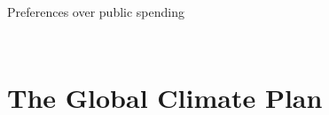 \documentclass[aspectratio=169,xcolor=dvipsnames, 11pt,mathserif]{beamer}
\begin{document}
\begin{frame}{Preferences over public spending%
	\hyperlink{support}{}}
\begin{columns}
\begin{column}{0.5\textwidth}
\begin{figure}
            \end{figure}
        \end{column}
    \end{columns}
	\bbvs \ip {}
	\ee 
\end{frame} 

\section{The Global Climate Plan}

\end{document}
